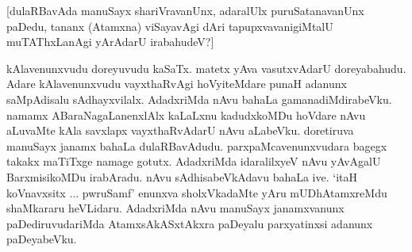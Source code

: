 [dulaRBavAda manuSayx shariVravanUnx, adaralUlx puruSatanavanUnx paDedu, tananx (Atamxna) viSayavAgi dAri tapupxvavanigiMtalU muTAThxLanAgi yArAdarU irabahudeV?]

kAlavenunxvudu doreyuvudu kaSaTx. matetx yAva vasutxvAdarU doreyabahudu. Adare kAlavenunxvudu vayxthaRvAgi hoVyiteMdare punaH adanunx saMpAdisalu sAdhayxvilalx. AdadxriMda nAvu bahaLa gamanadiMdirabeVku. namamx ABaraNagaLanenxlAlx kaLaLxnu kadudxkoMDu hoVdare nAvu aLuvaMte kAla savxlapx vayxthaRvAdarU nAvu aLabeVku. doretiruva manuSayx janamx bahaLa dulaRBavAdudu. parxpaMcavenunxvudara bagegx takakx maTiTxge namage gotutx. AdadxriMda idaralilxyeV nAvu yAvAgalU BarxmisikoMDu irabAradu. nAvu sAdhisabeVkAdavu bahaLa ive. `itaH koVnavxsitx $\ldots$ pwruSamf' enunxva sholxVkadaMte yAru mUDhAtamxreMdu shaMkararu heVLidaru. AdadxriMda nAvu manuSayx janamxvanunx paDediruvudariMda AtamxsAkASxtAkxra paDeyalu parxyatinxsi adanunx paDeyabeVku. 



\endchapter
